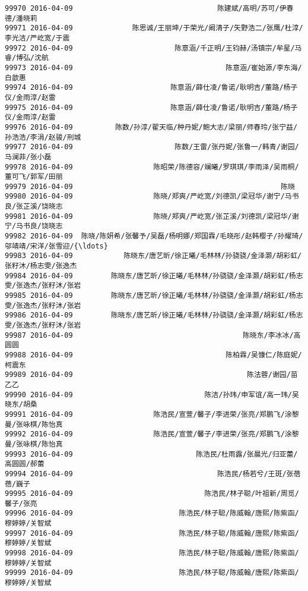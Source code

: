 \documentclass[11pt]{article}
\begin{document}
\begin{Verbatim}[commandchars=\\\{\}]
99970 2016-04-09                                  陈建斌/高明/苏可/伊春德/潘晓莉   
99971 2016-04-09              陈思诚/王丽坤/于荣光/阚清子/矢野浩二/张鹰/杜淳/李光洁/严屹宽/于震   
99972 2016-04-09                        陈意涵/千正明/王钧赫/汤镇宗/牟星/马睿/博弘/沈航   
99973 2016-04-09                                    陈意涵/崔始源/李东海/白歆惠   
99974 2016-04-09                       陈意涵/薛仕凌/鲁诺/耿明吉/董路/杨子仪/金雨淳/赵雷   
99975 2016-04-09                       陈意涵/薛仕凌/鲁诺/耿明吉/董路/杨子仪/金雨淳/赵雷   
99976 2016-04-09          陈数/孙淳/翟天临/种丹妮/鲍大志/梁丽/师春玲/张宁益/孙浩浩/李涓/赵骏/刑城   
99977 2016-04-09                        陈数/王雷/张丹妮/张鲁一/韩青/谢园/马澜菲/张小磊   
99978 2016-04-09                   陈昭荣/陈德容/斓曦/罗琪琪/李雨泽/吴雨桐/董可飞/郭军/田丽   
99979 2016-04-09                                                 陈晓   
99980 2016-04-09                   陈晓/郑爽/严屹宽/刘德凯/梁冠华/谢宁/马书良/张芷溪/饶晓志   
99981 2016-04-09                   陈晓/郑爽/严屹宽/张芷溪/刘德凯/梁冠华/谢宁/马书良/饶晓志   
99982 2016-04-09  陈晓/陈妍希/张馨予/吴磊/杨明娜/郑国霖/毛晓彤/赵韩樱子/孙耀琦/邬靖靖/宋洋/张雪迎/{\ldots}   
99983 2016-04-09            陈晓东/唐艺昕/徐正曦/毛林林/孙骁骁/金泽灏/胡彩虹/张籽沐/杨志雯/张逸杰   
99984 2016-04-09         陈晓东/唐艺昕/徐正曦/毛林林/孙骁骁/金泽灏/胡彩虹/杨志雯/张逸杰/张籽沐/张岩   
99985 2016-04-09         陈晓东/唐艺昕/徐正曦/毛林林/孙骁骁/金泽灏/胡彩虹/杨志雯/张逸杰/张籽沐/张岩   
99986 2016-04-09         陈晓东/唐艺昕/徐正曦/毛林林/孙骁骁/金泽灏/胡彩虹/杨志雯/张逸杰/张籽沐/张岩   
99987 2016-04-09                                        陈晓东/李冰冰/高圆圆   
99988 2016-04-09                                    陈柏霖/吴慷仁/陈庭妮/柯震东   
99989 2016-04-09                                         陈法蓉/谢园/苗乙乙   
99990 2016-04-09                               陈洁/孙玮/申军谊/高一玮/吴晓东/胡桑   
99991 2016-04-09                   陈浩民/宣萱/馨子/李进荣/张亮/郑鹏飞/涂黎曼/张咏棋/陈怡真   
99992 2016-04-09                   陈浩民/宣萱/馨子/李进荣/张亮/郑鹏飞/涂黎曼/张咏棋/陈怡真   
99993 2016-04-09                             陈浩民/杜雨露/张晨光/归亚蕾/高圆圆/郝蕾   
99994 2016-04-09                                  陈浩民/杨若兮/王斑/张蓓蓓/巍子   
99995 2016-04-09                               陈浩民/林子聪/叶祖新/周觅/馨子/张亮   
99996 2016-04-09                         陈浩民/林子聪/陈威翰/唐熙/陈紫函/穆婷婷/关智斌   
99997 2016-04-09                         陈浩民/林子聪/陈威翰/唐熙/陈紫函/穆婷婷/关智斌   
99998 2016-04-09                         陈浩民/林子聪/陈威翰/唐熙/陈紫函/穆婷婷/关智斌   
99999 2016-04-09                         陈浩民/林子聪/陈威翰/唐熙/陈紫函/穆婷婷/关智斌   


\end{Verbatim}
\end{document}
